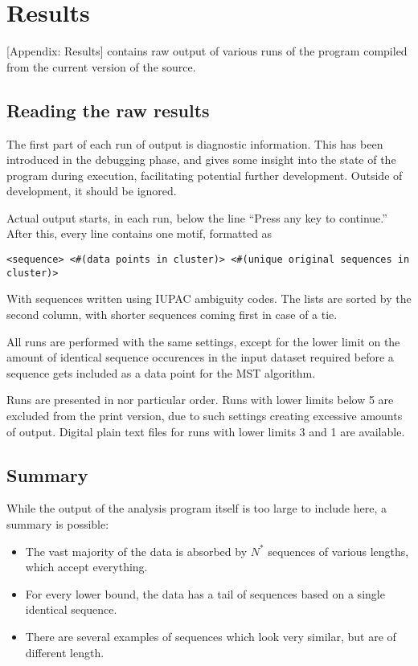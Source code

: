 \documentclass[fleqn]{book}
\providecommand{\tightlist}{%
  \setlength{\itemsep}{0pt}\setlength{\parskip}{0pt}}
\begin{document}
\chapter{Results}\label{results}

{[}Appendix: Results{]} contains raw output of various runs of the
program compiled from the current version of the source.

\section{Reading the raw results}\label{reading-the-raw-results}

The first part of each run of output is diagnostic information. This has
been introduced in the debugging phase, and gives some insight into the
state of the program during execution, facilitating potential further
development. Outside of development, it should be ignored.

Actual output starts, in each run, below the line ``Press any key to
continue.'' After this, every line contains one motif, formatted as

\begin{verbatim}
<sequence> <#(data points in cluster)> <#(unique original sequences in cluster)>
\end{verbatim}

With sequences written using IUPAC ambiguity codes. The lists are sorted
by the second column, with shorter sequences coming first in case of a
tie.

All runs are performed with the same settings, except for the lower
limit on the amount of identical sequence occurences in the input
dataset required before a sequence gets included as a data point for the
MST algorithm.

Runs are presented in nor particular order. Runs with lower limits below
5 are excluded from the print version, due to such settings creating
excessive amounts of output. Digital plain text files for runs with
lower limits 3 and 1 are available.

\section{Summary}\label{summary}

While the output of the analysis program itself is too large to include
here, a summary is possible:

\begin{itemize}
\tightlist
\item
  The vast majority of the data is absorbed by \(N^*\) sequences of
  various lengths, which accept everything.
\item
  For every lower bound, the data has a tail of sequences based on a
  single identical sequence.
\item
  There are several examples of sequences which look very similar, but
  are of different length.
\end{itemize}
\end{document}
